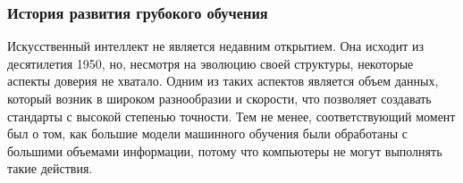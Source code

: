 \begin{frame}
    \frametitle{История развития грубокого обучения}

    Искусственный интеллект не является недавним открытием.
    Она исходит из десятилетия 1950, но,
    несмотря на эволюцию своей структуры,
    некоторые аспекты доверия не хватало.
    Одним из таких аспектов является объем данных,
    который возник в широком разнообразии и скорости,
    что позволяет создавать стандарты с высокой степенью точности.
    Тем не менее, соответствующий момент был о том,
    как большие модели машинного обучения были обработаны с большими объемами информации,
    потому что компьютеры не могут выполнять такие действия.

\end{frame}